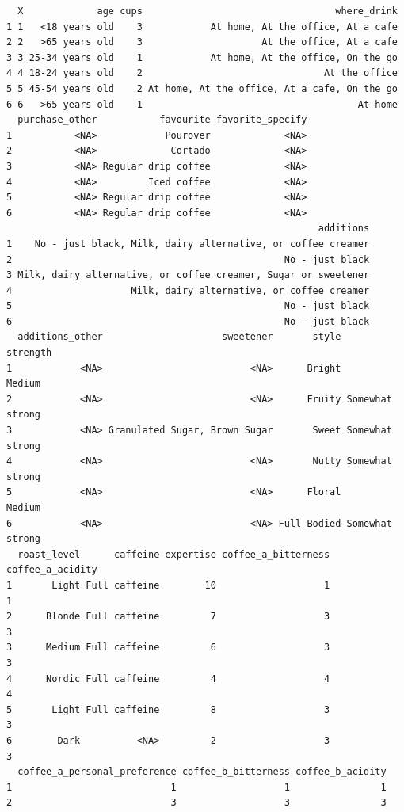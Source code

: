 \documentclass[
  letterpaper,
  DIV=11,
  numbers=noendperiod]{scrartcl}
\begin{document}
\begin{verbatim}
  X             age cups                                  where_drink
1 1   <18 years old    3            At home, At the office, At a cafe
2 2   >65 years old    3                     At the office, At a cafe
3 3 25-34 years old    1            At home, At the office, On the go
4 4 18-24 years old    2                                At the office
5 5 45-54 years old    2 At home, At the office, At a cafe, On the go
6 6   >65 years old    1                                      At home
  purchase_other           favourite favorite_specify
1           <NA>            Pourover             <NA>
2           <NA>             Cortado             <NA>
3           <NA> Regular drip coffee             <NA>
4           <NA>         Iced coffee             <NA>
5           <NA> Regular drip coffee             <NA>
6           <NA> Regular drip coffee             <NA>
                                                       additions
1    No - just black, Milk, dairy alternative, or coffee creamer
2                                                No - just black
3 Milk, dairy alternative, or coffee creamer, Sugar or sweetener
4                     Milk, dairy alternative, or coffee creamer
5                                                No - just black
6                                                No - just black
  additions_other                     sweetener       style        strength
1            <NA>                          <NA>      Bright          Medium
2            <NA>                          <NA>      Fruity Somewhat strong
3            <NA> Granulated Sugar, Brown Sugar       Sweet Somewhat strong
4            <NA>                          <NA>       Nutty Somewhat strong
5            <NA>                          <NA>      Floral          Medium
6            <NA>                          <NA> Full Bodied Somewhat strong
  roast_level      caffeine expertise coffee_a_bitterness coffee_a_acidity
1       Light Full caffeine        10                   1                1
2      Blonde Full caffeine         7                   3                3
3      Medium Full caffeine         6                   3                3
4      Nordic Full caffeine         4                   4                4
5       Light Full caffeine         8                   3                3
6        Dark          <NA>         2                   3                3
  coffee_a_personal_preference coffee_b_bitterness coffee_b_acidity
1                            1                   1                1
2                            3                   3                3

\end{verbatim}
\end{document}
